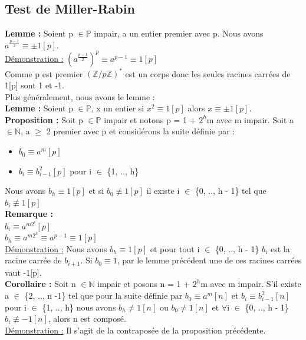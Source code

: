 \documentclass[12pt,a4paper]{article}
\newcommand\tab[1][0.65cm]{\hspace*{#1}}
\begin{document}
\subsection{Test de Miller-Rabin}
\textbf{Lemme :} Soient p $\in \mathbb{P}$ impair, a un entier premier avec p. Nous avons $a^{\frac{p - 1}{2}} \equiv \pm 1[p]$.\\
\underline{Démonstration :} $(a^{\frac{p - 1}{2}})^p \equiv a^{p - 1} \equiv 1[p]$\\
Comme p est premier $(\mathbb{Z}/p\mathbb{Z})^*$ est un corps donc les seules racines carrées de 1[p] sont 1 et -1.\\
Plus généralement, nous avons le lemme :\\
\textbf{Lemme :} Soient p $\in \mathbb{P}$, x un entier si $x^2 \equiv 1[p]$ alors $x \equiv \pm1[p]$.\\
\textbf{Proposition :} Soit p $\in \mathbb{P}$ impair et notons p = 1 + $2^h$m avec m impair. Soit a $\in \mathbb{N}$, a $\geq$ 2 premier avec p et considérons la suite définie par :
\begin{itemize}
	\item $b_0 \equiv a^m [p]$
	\item $b_i \equiv b^2_{i - 1} [p]$ pour i $\in$ \{1, .., h\}
\end{itemize}
Nous avons $b_h \equiv 1[p]$ et si $b_0 \not\equiv 1[p]$ il existe i $\in$ \{0, .., h - 1\} tel que $b_i \not\equiv 1[p]$\\
\textbf{Remarque :}\\
\tab$b_i \equiv a^{m2^i} [p]$\\
\tab$b_h \equiv a^{m2^h} \equiv a^{p - 1} \equiv 1[p]$\\
\underline{Démonstration :} Nous avons $b_h \equiv 1[p]$ et pour tout i $\in$ \{0, .., h - 1\} $b_i$ est la racine carrée de $b_{i + 1}$. Si $b_0 \equiv 1$, par le lemme précédent une de ces racines carrées vaut -1[p].\\
\textbf{Corollaire :} Soit n $\in \mathbb{N}$ impair et posons n = 1 + $2^h$m avec m impair. S'il existe a $\in$ \{2, .., n -1\} tel que pour la suite définie par $b_0 \equiv a^m[n]$ et $b_i \equiv b_{i - 1}^2[n]$ pour i $\in$ \{1, .., h\} nous avons $b_h \neq 1[n]$ ou $b_0 \neq 1[n]$ et $\forall$i $\in$ \{0, .., h - 1\} $b_i \not\equiv -1[n]$, alors n est composé.\\
\underline{Démonstration :} Il s'agit de la contraposée de la proposition précédente.
\end{document}
